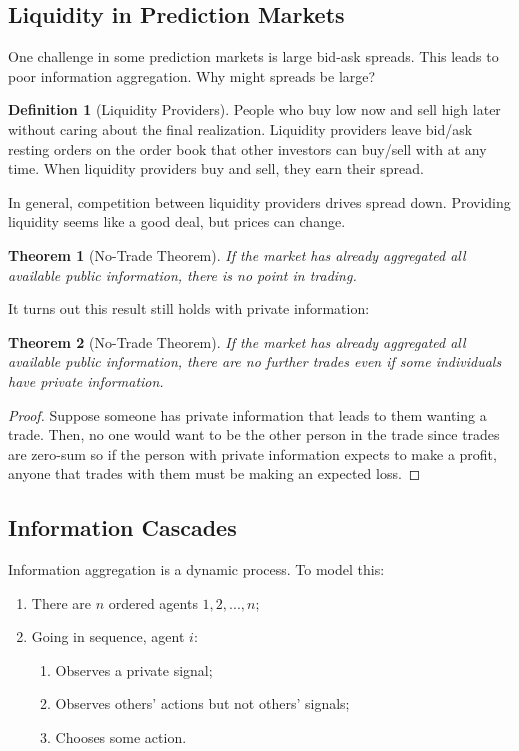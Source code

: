 \documentclass[dvipsnames]{article}
\newtheorem{theorem}{Theorem}[section]
\theoremstyle{definition}
\newtheorem{definition}{Definition}[section]
\theoremstyle{remark}
\begin{document}
\subsection{Liquidity in Prediction Markets}
One challenge in some prediction markets is large bid-ask spreads. This leads to poor information aggregation. Why might spreads be large?

\begin{definition}[Liquidity Providers]
	People who buy low now and sell high later without caring about the final realization. Liquidity providers leave bid/ask resting orders on the order book that other investors can buy/sell with at any time. When liquidity providers buy and sell, they earn their spread. 
\end{definition}

In general, competition between liquidity providers drives spread down. Providing liquidity seems like a good deal, but prices can change.

\begin{theorem}[No-Trade Theorem]
	If the market has already aggregated all available public information, there is no point in trading.
\end{theorem}

It turns out this result still holds with private information:

\begin{theorem}[No-Trade Theorem]
	If the market has already aggregated all available public information, there are no further trades even if some individuals have private information.
\end{theorem}

\begin{proof}
	Suppose someone has private information that leads to them wanting a trade. Then, no one would want to be the other person in the trade since trades are zero-sum so if the person with private information expects to make a profit, anyone that trades with them must be making an expected loss.
\end{proof}

\subsection{Information Cascades}

Information aggregation is a dynamic process. To model this:
\begin{enumerate}
	\item There are $n$ ordered agents $1,2,...,n$;
	\item Going in sequence, agent $i$:
	\begin{enumerate}
		\item Observes a private signal;
		\item Observes others' actions but not others' signals;
		\item Chooses some action.
	\end{enumerate}
\end{enumerate}
\end{document}
